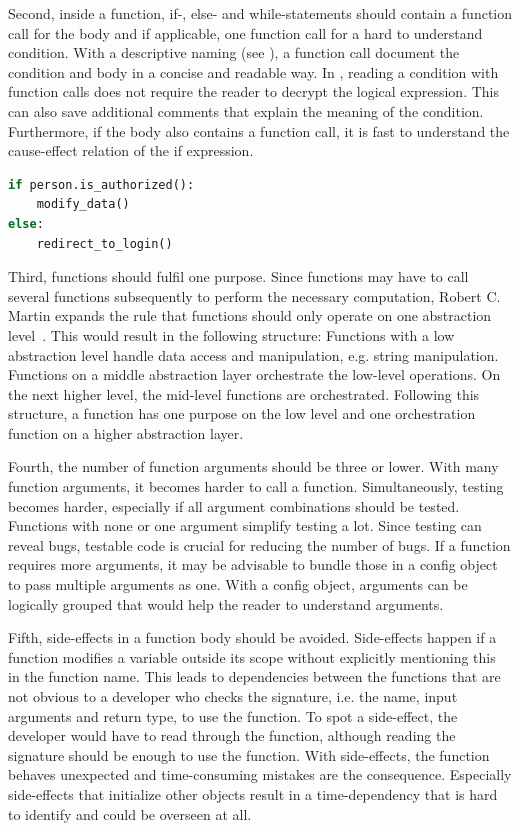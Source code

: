 Second, inside a function, if-, else- and while-statements should contain a function call for the body and if applicable, one function call for a hard to understand condition. With a descriptive naming (see ), a function call document the condition and body in a concise and readable way. In , reading a condition with function calls does not require the reader to decrypt the logical expression. This can also save additional comments that explain the meaning of the condition. Furthermore, if the body also contains a function call, it is fast to understand the cause-effect relation of the if expression. 

\begin{lstlisting}[float=t , language=Python, label=lst:function_method_call, caption={Sample for using functions with if-statements with increased documentary value of the cause effect relationship.}]
if person.is_authorized():
    modify_data()
else:
    redirect_to_login()
\end{lstlisting}


Third, functions should fulfil one purpose. Since functions may have to call several functions subsequently to perform the necessary computation, Robert C. Martin expands the rule that functions should only operate on one abstraction level~\cite{martin_clean_2009}. This would result in the following structure:
Functions with a low abstraction level handle data access and manipulation, e.g. string manipulation. Functions on a middle abstraction layer orchestrate the low-level operations. On the next higher level, the mid-level functions are orchestrated. Following this structure, a function has one purpose on the low level and one orchestration function on a higher abstraction layer. 

Fourth, the number of function arguments should be three or lower. With many function arguments, it becomes harder to call a function. Simultaneously, testing becomes harder, especially if all argument combinations should be tested. Functions with none or one argument simplify testing a lot. Since testing can reveal bugs, testable code is crucial for reducing the number of bugs.
If a function requires more arguments, it may be advisable to bundle those in a config object to pass multiple arguments as one. With a config object, arguments can be logically grouped that would help the reader to understand arguments. 

Fifth, side-effects in a function body should be avoided. Side-effects happen if a function modifies a variable outside its scope without explicitly mentioning this in the function name. This leads to dependencies between the functions that are not obvious to a developer who checks the signature, i.e. the name, input arguments and return type, to use the function. To spot a side-effect, the developer would have to read through the function, although reading the signature should be enough to use the function. With side-effects, the function behaves unexpected and time-consuming mistakes are the consequence. Especially side-effects that initialize other objects result in a time-dependency that is hard to identify and could be overseen at all.

